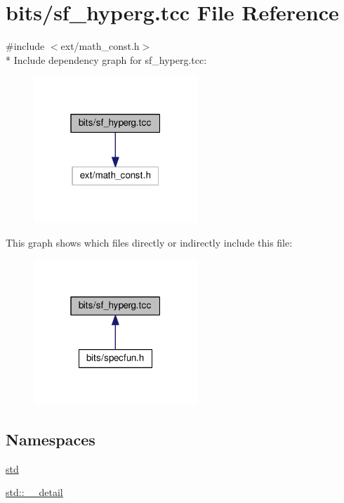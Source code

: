 \hypertarget{sf__hyperg_8tcc}{}\section{bits/sf\+\_\+hyperg.tcc File Reference}
\label{sf__hyperg_8tcc}
{\ttfamily \#include $<$ext/math\+\_\+const.\+h$>$}\\*
Include dependency graph for sf\+\_\+hyperg.\+tcc\+:
\nopagebreak
\begin{figure}[H]
\begin{center}
\leavevmode
\includegraphics[width=175pt]{sf__hyperg_8tcc__incl}
\end{center}
\end{figure}
This graph shows which files directly or indirectly include this file\+:
\nopagebreak
\begin{figure}[H]
\begin{center}
\leavevmode
\includegraphics[width=175pt]{sf__hyperg_8tcc__dep__incl}
\end{center}
\end{figure}
\subsection*{Namespaces}
\begin{DoxyCompactItemize}
\item 
 \hyperlink{namespacestd}{std}
\item 
 \hyperlink{namespacestd_1_1____detail}{std\+::\+\_\+\+\_\+detail}
\end{DoxyCompactItemize}
